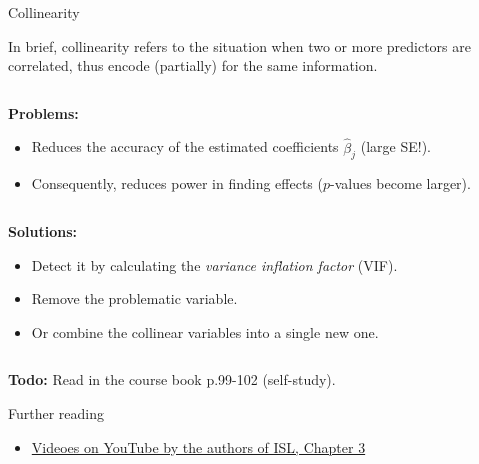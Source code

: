 \documentclass[10pt,ignorenonframetext,]{beamer}
\providecommand{\tightlist}{%
  \setlength{\itemsep}{0pt}\setlength{\parskip}{0pt}}
\begin{document}
\begin{frame}

\begin{block}{Collinearity}

\vspace{2mm}

In brief, collinearity refers to the situation when two or more
predictors are correlated, thus encode (partially) for the same
information.

\(~\)

\textbf{Problems:}

\begin{itemize}
\item
  Reduces the accuracy of the estimated coefficients \(\hat\beta_j\)
  (large SE!).
\item
  Consequently, reduces power in finding effects (\(p\)-values become
  larger).
\end{itemize}

\(~\)

\textbf{Solutions:}

\begin{itemize}
\item
  Detect it by calculating the \emph{variance inflation factor} (VIF).
\item
  Remove the problematic variable.
\item
  Or combine the collinear variables into a single new one.
\end{itemize}

\(~\)

\textbf{Todo:} Read in the course book p.99-102 (self-study).

\end{block}

\end{frame}

\begin{frame}{ Further reading }
\protect\hypertarget{further-reading}{}

\begin{itemize}
\tightlist
\item
  \href{https://www.youtube.com/playlist?list=PL5-da3qGB5IBSSCPANhTgrw82ws7w_or9}{Videoes
  on YouTube by the authors of ISL, Chapter 3}
\end{itemize}

\end{frame}
\end{document}
